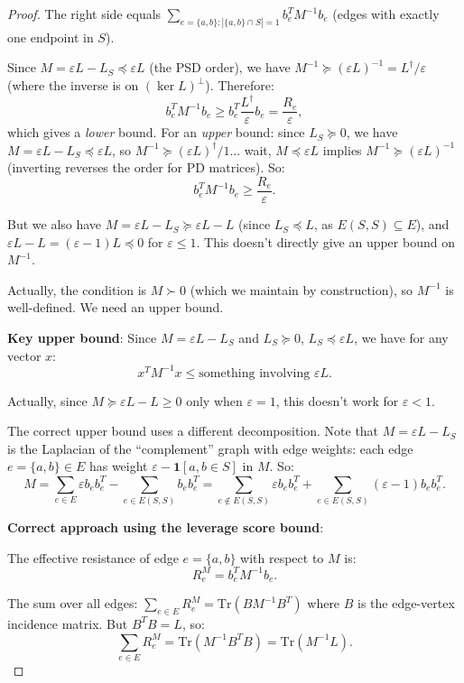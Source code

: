 \documentclass[12pt]{article}
\theoremstyle{definition}
\begin{document}
\begin{proof}
The right side equals $\sum_{e=\{a,b\}:|\{a,b\}\cap S|=1}b_e^T M^{-1}b_e$ (edges with exactly one endpoint in $S$).

Since $M = \varepsilon L - L_S \preceq \varepsilon L$ (the PSD order), we have $M^{-1} \succeq (\varepsilon L)^{-1} = L^\dagger/\varepsilon$ (where the inverse is on $(\ker L)^\perp$). Therefore:
$$b_e^T M^{-1} b_e \geq b_e^T \frac{L^\dagger}{\varepsilon} b_e = \frac{R_e}{\varepsilon},$$
which gives a \emph{lower} bound. For an \emph{upper} bound: since $L_S \succeq 0$, we have $M = \varepsilon L - L_S \preceq \varepsilon L$, so $M^{-1} \succeq (\varepsilon L)^\dagger/1$... wait, $M \preceq \varepsilon L$ implies $M^{-1} \succeq (\varepsilon L)^{-1}$ (inverting reverses the order for PD matrices). So:
$$b_e^T M^{-1}b_e \geq \frac{R_e}{\varepsilon}.$$

But we also have $M = \varepsilon L - L_S \succeq \varepsilon L - L$ (since $L_S \preceq L$, as $E(S,S)\subseteq E$), and $\varepsilon L - L = (\varepsilon-1)L \preceq 0$ for $\varepsilon\leq 1$. This doesn't directly give an upper bound on $M^{-1}$.

Actually, the condition is $M \succ 0$ (which we maintain by construction), so $M^{-1}$ is well-defined. We need an upper bound.

\textbf{Key upper bound}: Since $M = \varepsilon L - L_S$ and $L_S \succeq 0$, $L_S \preceq \varepsilon L$, we have for any vector $x$:
$$x^T M^{-1} x \leq \text{something involving }\varepsilon L.$$

Actually, since $M \succeq \varepsilon L - L \geq 0$ only when $\varepsilon = 1$, this doesn't work for $\varepsilon < 1$.

The correct upper bound uses a different decomposition. Note that $M = \varepsilon L - L_S$ is the Laplacian of the ``complement'' graph with edge weights: each edge $e = \{a,b\}\in E$ has weight $\varepsilon - \mathbf{1}[a,b\in S]$ in $M$. So:
$$M = \sum_{e\in E}\varepsilon b_eb_e^T - \sum_{e\in E(S,S)}b_e b_e^T = \sum_{e\notin E(S,S)}\varepsilon b_eb_e^T + \sum_{e\in E(S,S)}(\varepsilon-1)b_eb_e^T.$$

\textbf{Correct approach using the leverage score bound}:

The effective resistance of edge $e = \{a,b\}$ with respect to $M$ is:
$$R_e^M = b_e^T M^{-1}b_e.$$

The sum over all edges: $\sum_{e\in E}R_e^M = \mathrm{Tr}(B M^{-1}B^T)$ where $B$ is the edge-vertex incidence matrix. But $B^T B = L$, so:
$$\sum_{e\in E}R_e^M = \mathrm{Tr}(M^{-1}B^T B) = \mathrm{Tr}(M^{-1}L).$$


\end{proof}
\end{document}
